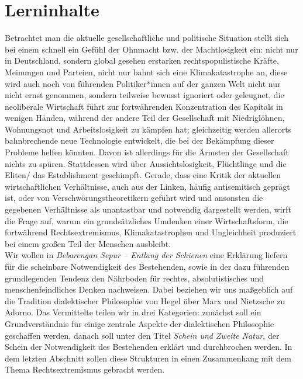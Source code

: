 \documentclass[a4paper, 12pt]{scrartcl}
\begin{document}
    \section{Lerninhalte}
    Betrachtet man die aktuelle gesellschaftliche und politische Situation stellt sich bei einem  schnell ein Gefühl der  Ohnmacht bzw. der Machtlosigkeit ein: nicht nur in Deutschland, sondern global gesehen erstarken rechtspopulistische Kräfte, Meinungen und Parteien, nicht nur bahnt sich eine Klimakatastrophe an, diese wird auch noch von führenden Politiker*innen auf der ganzen Welt nicht nur nicht ernst genommen, sondern teilweise bewusst ignoriert oder geleugnet, die neoliberale Wirtschaft führt zur fortwährenden Konzentration des Kapitals in wenigen Händen, während der andere Teil der Gesellschaft mit Niedriglöhnen, Wohnungsnot und Arbeitslosigkeit zu kämpfen hat; gleichzeitig werden allerorts bahnbrechende neue Technologie entwickelt, die bei der Bekämpfung dieser Probleme helfen könnten. 
    Davon ist allerdings für die Ärmsten der Gesellschaft nichts zu spüren. Stattdessen wird über Aussichtslosigkeit, Flüchtlinge und die Eliten/ das Establishment geschimpft. Gerade, dass eine Kritik der aktuellen wirtschaftlichen Verhältnisse, auch aus der Linken, häufig antisemitisch geprägt ist, oder von Verschwörungstheoretikern geführt wird und ansonsten die gegebenen Verhältnisse als unantastbar und notwendig dargestellt werden, wirft die Frage auf, warum ein grundsätzliches Umdenken einer Wirtschaftsform, die fortwährend Rechtsextremismus, Klimakatastrophen und Ungleichheit produziert bei einem großen Teil der Menschen ausbleibt. \\
    Wir wollen in \textit{Bebarengan Sepur – Entlang der Schienen} eine Erklärung liefern für die scheinbare Notwendigkeit des Bestehenden, sowie in der dazu führenden grundlegenden Tendenz den Nährboden für rechtes, absolutistisches und menschenfeindliches Denken nachweisen. 
    Dabei beziehen wir uns maßgeblich auf die Tradition dialektischer Philosophie von Hegel über Marx und Nietzsche zu Adorno. 
    Das Vermittelte teilen wir in drei Kategorien: zunächst soll ein Grundverständnis für einige zentrale Aspekte der dialektischen Philosophie geschaffen werden, danach soll unter den Titel \textit{Schein und Zweite Natur}, der Schein der Notwendigkeit des Bestehenden erklärt und durchbrochen werden. 
    In dem letzten Abschnitt sollen diese Strukturen in einen Zusammenhang mit dem Thema Rechtsextremismus gebracht werden.
\end{document}
